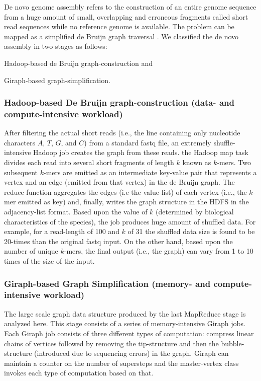 \documentclass[journal]{IEEEtran}
\begin{document}
De novo genome assembly refers to the construction of an entire genome sequence from a huge amount of small, overlapping and erroneous fragments called short read sequences while no reference genome is available. The problem can be mapped as a simplified de Bruijn graph traversal \cite{bio:debruijngraph}. We classified the de novo assembly in two stages as follows:
\begin{inparaenum}
\item Hadoop-based de Bruijn graph-construction and
\item Giraph-based graph-simplification.  
\end{inparaenum}

\subsubsection {Hadoop-based De Bruijn graph-construction (data- and compute-intensive workload)}
After filtering the actual short reads (i.e., the line containing only nucleotide characters $A$, $T$, $G$, and $C$) from a standard fastq file, an extremely shuffle-intensive Hadoop job creates the graph from these reads.  the Hadoop map task divides each read into several short fragments of length $k$ known as $k$-mers. Two subsequent $k$-mers are emitted as an intermediate key-value pair that represents  a vertex and an edge (emitted from that vertex) in the de Bruijn graph.  The reduce function aggregates the edges (i.e the value-list) of each vertex (i.e., the $k$-mer emitted as key) and, finally, writes the graph structure in the HDFS in the adjacency-list format. Based upon the value of $k$ (determined by biological characteristics of the species), the job produces huge amount of shuffled data. For example, for a read-length of 100 and $k$ of 31 the shuffled data size is found to be 20-times than the original fastq input. On the other hand, based upon the number of unique $k$-mers, the final output (i.e., the graph) can vary from 1 to 10 times of the size of the input. 

\subsubsection {Giraph-based Graph Simplification (memory- and compute-intensive workload)}
The large scale graph data structure produced by the last MapReduce stage is analyzed here. This stage consists of a series of memory-intensive Giraph jobs. Each Giraph job consists of three different types of computation: compress linear chains of vertices followed by removing the tip-structure and then the bubble-structure (introduced due to sequencing errors) in the graph. Giraph can maintain a counter on the number of supersteps and the master-vertex class invokes each type of computation based on that.  
\end{document}
